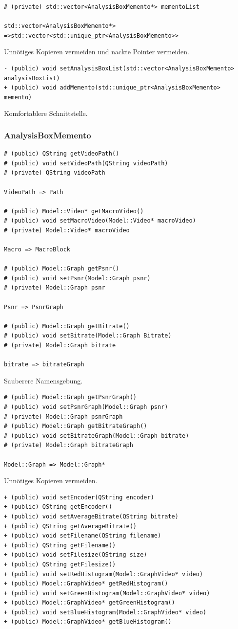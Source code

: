 \documentclass{scrartcl}
\begin{document}
{\begin{verbatim}
# (private) std::vector<AnalysisBoxMemento*> mementoList

std::vector<AnalysisBoxMemento*>
=>std::vector<std::unique_ptr<AnalysisBoxMemento>>
\end{verbatim}
Unnötiges Kopieren vermeiden und nackte Pointer vermeiden.
\bigskip
\begin{verbatim}
- (public) void setAnalysisBoxList(std::vector<AnalysisBoxMemento> analysisBoxList)
+ (public) void addMemento(std::unique_ptr<AnalysisBoxMemento> memento)
\end{verbatim}
Komfortablere Schnittstelle.
\bigskip
\subsubsection{AnalysisBoxMemento}
\bigskip
\begin{verbatim}
# (public) QString getVideoPath()
# (public) void setVideoPath(QString videoPath)
# (private) QString videoPath

VideoPath => Path

# (public) Model::Video* getMacroVideo()
# (public) void setMacroVideo(Model::Video* macroVideo)
# (private) Model::Video* macroVideo

Macro => MacroBlock

# (public) Model::Graph getPsnr()
# (public) void setPsnr(Model::Graph psnr)
# (private) Model::Graph psnr

Psnr => PsnrGraph

# (public) Model::Graph getBitrate()
# (public) void setBitrate(Model::Graph Bitrate)
# (private) Model::Graph bitrate

bitrate => bitrateGraph
\end{verbatim}
Sauberere Namensgebung.
\newpage
\begin{verbatim}
# (public) Model::Graph getPsnrGraph()
# (public) void setPsnrGraph(Model::Graph psnr)
# (private) Model::Graph psnrGraph
# (public) Model::Graph getBitrateGraph()
# (public) void setBitrateGraph(Model::Graph bitrate)
# (private) Model::Graph bitrateGraph

Model::Graph => Model::Graph*
\end{verbatim}
Unnötiges Kopieren vermeiden.
\bigskip
\begin{verbatim}
+ (public) void setEncoder(QString encoder)
+ (public) QString getEncoder()
+ (public) void setAverageBitrate(QString bitrate)
+ (public) QString getAverageBitrate()
+ (public) void setFilename(QString filename)
+ (public) QString getFilename()
+ (public) void setFilesize(QString size)
+ (public) QString getFilesize()
+ (public) void setRedHistogram(Model::GraphVideo* video)
+ (public) Model::GraphVideo* getRedHistogram()
+ (public) void setGreenHistogram(Model::GraphVideo* video)
+ (public) Model::GraphVideo* getGreenHistogram()
+ (public) void setBlueHistogram(Model::GraphVideo* video)
+ (public) Model::GraphVideo* getBlueHistogram()


\end{verbatim}}
\end{document}
